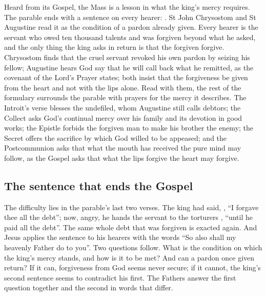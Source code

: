 \label{sec:debt-forgiven-from-the-heart}

Heard from its Gospel, the Mass is a lesson in what the king's mercy requires.
The parable ends with a sentence on every hearer: . St John Chrysostom and St Augustine read it as the condition of a
pardon already given. Every hearer is the servant who owed ten thousand talents
and was forgiven beyond what he asked, and the only thing the king asks in
return is that the forgiven forgive. Chrysostom finds that the cruel servant
revoked his own pardon by seizing his fellow; Augustine hears God say that he
will call back what he remitted, as the covenant of the Lord's Prayer states;
both insist that the forgiveness be given from the heart and not with the lips
alone. Read with them, the rest of the formulary surrounds the parable with
prayers for the mercy it describes. The Introit's verse blesses the undefiled,
whom Augustine still calls debtors; the Collect asks God's continual mercy over
his family and its devotion in good works; the Epistle forbids the forgiven man
to make his brother the enemy; the Secret offers the sacrifice by which God
willed to be appeased; and the Postcommunion asks that what the mouth has
received the pure mind may follow, as the Gospel asks that what the lips forgive
the heart may forgive.

\subsection{The sentence that ends the Gospel}

The difficulty lies in the parable's last two verses. The king had said, , ``I forgave thee all the debt''; now, angry, he hands the
servant to the torturers , ``until
he paid all the debt''. The same whole debt that was forgiven is exacted again.
And Jesus applies the sentence to his hearers with the words ``So also shall my
heavenly Father do to you''. Two questions follow. What is the condition on which
the king's mercy stands, and how is it to be met? And can a pardon once given
return? If it can, forgiveness from God seems never secure; if it cannot, the
king's second sentence seems to contradict his first. The Fathers answer the
first question together and the second in words that differ.


